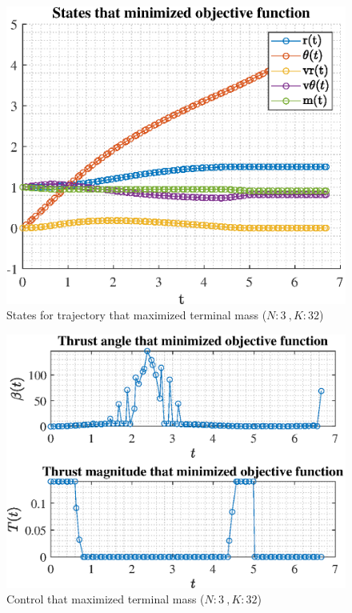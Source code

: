 \documentclass[]{article}
\begin{document}
\begin{figure}
	\centering
	\includegraphics[scale=0.75]{states_N3_K32_C3_mf.eps}
	\caption{States for trajectory that maximized terminal mass (\(N:3\ , K:32\))}
	\label{fig:states_N3_K32_C3_mf}
\end{figure}
\begin{figure}
	\centering
	\includegraphics[scale=0.75]{control_N3_K32_C3_mf.eps}
	\caption{Control that maximized terminal mass (\(N:3\ , K:32\))}
	\label{fig:control_N3_K32_C3_mf}
\end{figure}
\end{document}
